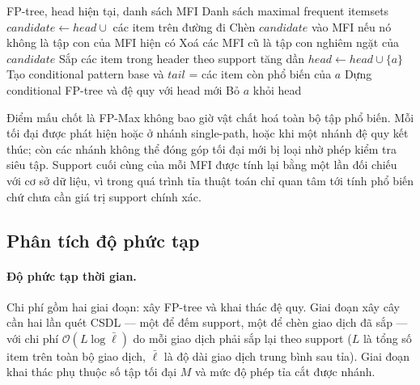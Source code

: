 \begin{algorithm}[H]
\caption{FP-Max}
\begin{algorithmic}[1]
\Require FP-tree, head hiện tại, danh sách MFI
\Ensure Danh sách maximal frequent itemsets
 
    \State $candidate \gets head \cup$ các item trên đường đi
    \State Chèn $candidate$ vào MFI nếu nó không là tập con của MFI hiện có
    \State Xoá các MFI cũ là tập con nghiêm ngặt của $candidate$
    \State \Return
\EndIf
\State Sắp các item trong header theo support tăng dần 
    \State $head \gets head \cup \{a\}$
    \State Tạo conditional pattern base và $tail$ = các item còn phổ biến của $a$
     
        \State Dựng conditional FP-tree và đệ quy với head mới
    \EndIf {}
    \State Bỏ $a$ khỏi head
\EndFor
\end{algorithmic}
\end{algorithm}

Điểm mấu chốt là FP-Max không bao giờ vật chất hoá toàn bộ tập phổ biến. Mỗi tối đại được phát hiện hoặc ở nhánh single-path, hoặc khi một nhánh đệ quy kết thúc; còn các nhánh không thể đóng góp tối đại mới bị loại nhờ phép kiểm tra siêu tập. Support cuối cùng của mỗi MFI được tính lại bằng một lần đối chiếu với cơ sở dữ liệu, vì trong quá trình tỉa thuật toán chỉ quan tâm tới tính phổ biến chứ chưa cần giá trị support chính xác.

\subsection{Phân tích độ phức tạp}

\paragraph{Độ phức tạp thời gian.}
Chi phí gồm hai giai đoạn: xây FP-tree và khai thác đệ quy. Giai đoạn xây cây cần hai lần quét CSDL --- một để đếm support, một để chèn giao dịch đã sắp --- với chi phí $\mathcal{O}(L\log\bar{\ell})$ do mỗi giao dịch phải sắp lại theo support ($L$ là tổng số item trên toàn bộ giao dịch, $\bar{\ell}$ là độ dài giao dịch trung bình sau tỉa). Giai đoạn khai thác phụ thuộc số tập tối đại $M$ và mức độ phép tỉa cắt được nhánh.

